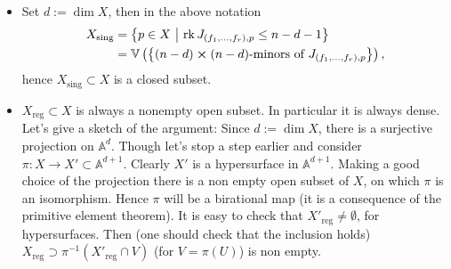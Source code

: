 \begin{rem}\leavevmode\vspace{-.2\baselineskip}
	\begin{itemize}
		\item Set $d := \dim X$, then in the above notation
			\begin{align}
				X_{\text{sing}} &= \left\{ p \in X \ \middle|\ 
			\mathrm{rk}\, J_{\left( f_1, \ldots, f_r \right), p} \leq n-d-1\right\}\\
				&= \mathbb{V}\left( \left\{ (n-d) \cross (n-d) \text{-minors of }
				J_{\left( f_1, \ldots, f_r \right), p}\right\} \right)		
			,\end{align} 
			hence $X_{\text{sing}} \subset X$ is a closed subset.
		\item $X_{\text{reg}} \subset X$ is always a nonempty open subset.
			In particular it is always dense.
			Let's give a sketch of the argument:
			Since $d := \dim X$, there is a surjective projection on $\mathbb{A}^{d}$.
			Though let's stop a step earlier and consider
			$\pi: X \to X' \subset \mathbb{A}^{d+1}$. Clearly $X'$ is a
			hypersurface in $\mathbb{A}^{d+1}$.
			Making a good choice of the projection there is a non empty open
			subset of $X$, on which $\pi$ is an isomorphism.
			Hence $\pi$ will be a birational map (it is a consequence of the
			primitive element theorem).
			It is easy to check that $X'_{\text{reg}} \neq \emptyset$, for hypersurfaces.
			Then (one should check that the inclusion holds)
			$X_{\text{reg}} \supset \pi^{-1} \left( X'_{\text{reg}} \cap V \right)$
			(for $V = \pi(U)$) is non empty.
	\end{itemize}
\end{rem} 

